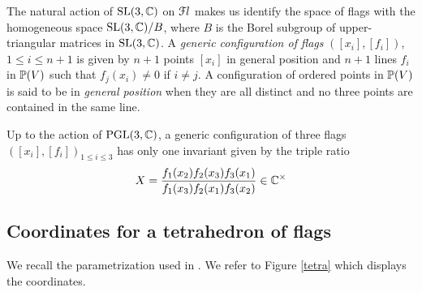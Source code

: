 The natural action of $\SL(3,\bC)$ on $\Fl$
makes us identify the space of flags  with the homogeneous space $\SL(3,\bC)/ B$, where $B$ is the Borel subgroup of upper-triangular matrices in $\SL(3,\bC)$.
A {\it generic configuration of  flags} $([x_i],[f_i])$, $1\leq i\leq n+1$
is given by $n+1$ points $[x_i]$ in general position and $n+1$ lines $f_i$
in $\P(V)$ such that $f_j(x_i)\neq 0$ if $i\neq j$.
A configuration of ordered points in $\P(V)$ is said to be in {\it general position} when they are all distinct and no three points are contained in the same line.




Up to the action of $\PGL(3,\bC)$, a generic configuration of three flags $([x_i],[f_i])_{1\leq i \leq 3}$ has  only one invariant given by  the triple ratio
$$
X=\Frac{f_1(x_2)f_2(x_3)f_3(x_1)}{f_1(x_3)f_2(x_1)f_3(x_2)}\in \bC^{\times}
$$

\subsection{Coordinates for a tetrahedron of flags}



We recall the parametrization used in \cite{BFG}.  We refer to Figure \ref{tetra} which displays the coordinates.

